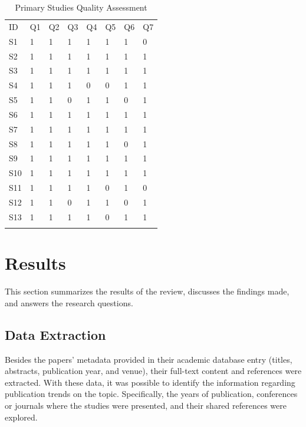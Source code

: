 \documentclass[conference]{IEEEtran}
\begin{document}
\begin{table}[!htbp]
\caption{Primary Studies Quality Assessment}
\label{tab:scores}       %
\begin{tabular}{p{0.4cm}p{0.7cm}p{0.7cm}p{0.7cm}p{0.7cm}p{0.7cm}p{0.7cm}p{0.7cm}}
\hline\noalign{\smallskip}
ID & Q1 & Q2 & Q3 & Q4 & Q5 & Q6 & Q7 \\
\noalign{\smallskip}\hline\noalign{\smallskip}
    S1 & 1 & 1 & 1 & 1 & 1 & 1 & 0 \\
    S2 & 1 & 1 & 1 & 1 & 1 & 1 & 1 \\
    S3 & 1 & 1 & 1 & 1 & 1 & 1 & 1 \\
    S4 & 1 & 1 & 1 & 0 & 0 & 1 & 1 \\
    S5 & 1 & 1 & 0 & 1 & 1 & 0 & 1 \\
    S6 & 1 & 1 & 1 & 1 & 1 & 1 & 1 \\
    S7 & 1 & 1 & 1 & 1 & 1 & 1 & 1 \\
    S8 & 1 & 1 & 1 & 1 & 1 & 0 & 1 \\
    S9 & 1 & 1 & 1 & 1 & 1 & 1 & 1 \\
    S10 & 1 & 1 & 1 & 1 & 1 & 1 & 1 \\
    S11 & 1 & 1 & 1 & 1 & 0 & 1 & 0 \\
    S12 & 1 & 1 & 0 & 1 & 1 & 0 & 1 \\
    S13 & 1 & 1 & 1 & 1 & 0 & 1 & 1 \\
\noalign{\smallskip}\hline
\end{tabular}
\end{table}

\section{Results}
\label{results}

This section summarizes the results of the review, discusses the findings made, and answers the research questions.

\subsection{Data Extraction}

Besides the papers' metadata provided in their academic database entry (titles, abstracts, publication year, and venue), their full-text content and references were extracted. With these data, it was possible to identify the information regarding publication trends on the topic. Specifically, the years of publication, conferences or journals where the studies were presented, and their shared references were explored.
\end{document}
